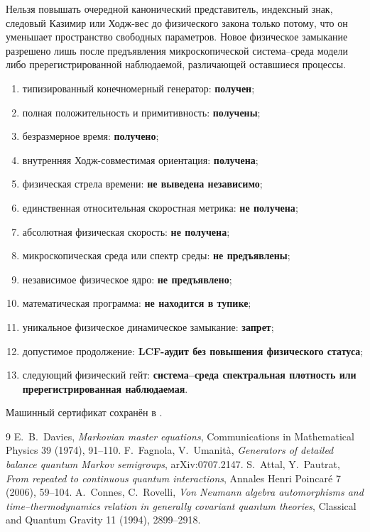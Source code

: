 \begin{nogocriterion}
Нельзя повышать очередной канонический представитель, индексный знак,
следовый Казимир или Ходж-вес до физического закона только потому, что он
уменьшает пространство свободных параметров. Новое физическое замыкание
разрешено лишь после предъявления микроскопической система--среда модели либо
пререгистрированной наблюдаемой, различающей оставшиеся процессы.
\end{nogocriterion}

\begin{protocol}
\begin{enumerate}
 \item типизированный конечномерный генератор: \textbf{получен};
 \item полная положительность и примитивность: \textbf{получены};
 \item безразмерное время: \textbf{получено};
 \item внутренняя Ходж-совместимая ориентация: \textbf{получена};
 \item физическая стрела времени: \textbf{не выведена независимо};
 \item единственная относительная скоростная метрика: \textbf{не получена};
 \item абсолютная физическая скорость: \textbf{не получена};
 \item микроскопическая среда или спектр среды: \textbf{не предъявлены};
 \item независимое физическое ядро: \textbf{не предъявлено};
 \item математическая программа: \textbf{не находится в тупике};
 \item уникальное физическое динамическое замыкание: \textbf{запрет};
 \item допустимое продолжение: \textbf{LCF-аудит без повышения физического статуса};
 \item следующий физический гейт: \textbf{система--среда спектральная плотность
 или пререгистрированная наблюдаемая}.
\end{enumerate}
\end{protocol}

Машинный сертификат сохранён в
.

\begin{thebibliography}{9}
E.~B.~Davies,
\emph{Markovian master equations},
Communications in Mathematical Physics 39 (1974), 91--110.
F.~Fagnola, V.~Umanit\`a,
\emph{Generators of detailed balance quantum Markov semigroups},
arXiv:0707.2147.
S.~Attal, Y.~Pautrat,
\emph{From repeated to continuous quantum interactions},
Annales Henri Poincar\'e 7 (2006), 59--104.
A.~Connes, C.~Rovelli,
\emph{Von Neumann algebra automorphisms and time--thermodynamics relation
in generally covariant quantum theories},
Classical and Quantum Gravity 11 (1994), 2899--2918.
\end{thebibliography}